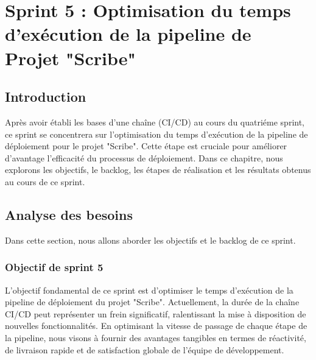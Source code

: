 \chapter{Sprint 5 : Optimisation du temps d'exécution de la pipeline de Projet "Scribe"}
\section{Introduction}
Après avoir établi les bases d'une chaîne (CI/CD) au cours du quatriéme sprint, ce sprint se concentrera sur l'optimisation du temps d'exécution de la pipeline de déploiement pour le projet "Scribe". Cette étape est cruciale pour améliorer d'avantage l'efficacité du processus de déploiement. Dans ce chapitre, nous explorons les objectifs, le backlog, les étapes de réalisation et les résultats obtenus au cours de ce sprint.\\

\section{Analyse des besoins}
Dans cette section, nous allons aborder les objectifs et le backlog de ce sprint.
\subsection{Objectif de sprint 5}
L'objectif fondamental de ce sprint est d'optimiser le temps d'exécution de la pipeline de déploiement du projet "Scribe". Actuellement, la durée de la chaîne CI/CD peut représenter un frein significatif, ralentissant la mise à disposition de nouvelles fonctionnalités. En optimisant la vitesse de passage de chaque étape de la pipeline, nous visons à fournir des avantages tangibles en termes de réactivité, de livraison rapide et de satisfaction globale de l'équipe de développement.

